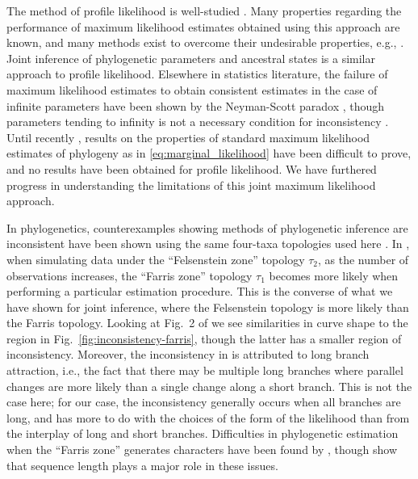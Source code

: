 \documentclass{article}
\begin{document}
The method of profile likelihood is well-studied \cite{Murphy2000-ry}.
Many properties regarding the performance of maximum likelihood estimates obtained using this approach are known, and many methods exist to overcome their undesirable properties, e.g., \cite{Geman1982}.
Joint inference of phylogenetic parameters and ancestral states \cite{Sagulenko2017-jo} is a similar approach to profile likelihood.
Elsewhere in statistics literature, the failure of maximum likelihood estimates to obtain consistent estimates in the case of infinite parameters have been shown by the Neyman-Scott paradox \cite{Neyman1948-tt}, though parameters tending to infinity is not a necessary condition for inconsistency \cite{LeCam1990}.
Until recently \cite{RoyChoudhury2015-ta}, results on the properties of standard maximum likelihood estimates of phylogeny as in \eqref{eq:marginal_likelihood} have been difficult to prove, and no results have been obtained for profile likelihood.
We have furthered progress in understanding the limitations of this joint maximum likelihood approach.

In phylogenetics, counterexamples showing methods of phylogenetic inference are inconsistent have been shown using the same four-taxa topologies used here \cite{Felsenstein1978-rr}.
In \cite{Felsenstein1978-rr}, when simulating data under the ``Felsenstein zone'' topology $\tau_2$, as the number of observations increases, the ``Farris zone'' topology $\tau_1$ becomes more likely when performing a particular estimation procedure.
This is the converse of what we have shown for joint inference, where the Felsenstein topology is more likely than the Farris topology.
Looking at Fig.~2 of \cite{Felsenstein1978-rr} we see similarities in curve shape to the region in Fig.~\ref{fig:inconsistency-farris}, though the latter has a smaller region of inconsistency.
Moreover, the inconsistency in \cite{Felsenstein1978-rr} is attributed to long branch attraction, i.e., the fact that there may be multiple long branches where parallel changes are more likely than a single change along a short branch.
This is not the case here; for our case, the inconsistency generally occurs when all branches are long, and has more to do with the choices of the form of the likelihood than from the interplay of long and short branches.
Difficulties in phylogenetic estimation when the ``Farris zone'' generates characters have been found by \cite{Siddall1998-hq}, though \cite{Swofford2001-hr} show that sequence length plays a major role in these issues.
\end{document}
